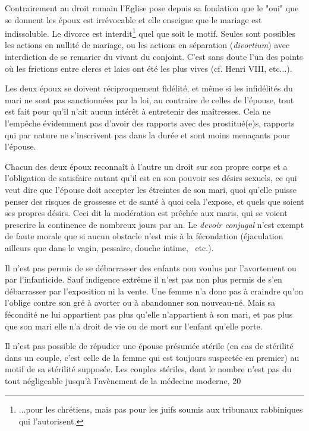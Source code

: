  Contrairement au droit romain l'Eglise pose depuis sa fondation que le "oui" que se donnent les époux est irrévocable et elle enseigne que le mariage est indissoluble. Le divorce est interdit\footnote{...pour les chrétiens, mais pas pour les juifs soumis aux tribunaux rabbiniques qui l'autorisent.} quel que soit le motif. Seules sont possibles les actions en nullité de mariage, ou les actions en séparation (\emph{divortium}) avec interdiction de se remarier du vivant du conjoint. C'est sans doute l'un des points où les frictions entre clercs et laics ont été les plus vives (cf. Henri VIII, etc...).



 Les deux époux se doivent réciproquement fidélité, et même si les infidélités du mari ne sont pas sanctionnées par la loi, au contraire de celles de l'épouse, tout est fait pour qu'il n'ait aucun intérêt à entretenir des maîtresses. Cela ne l'empêche évidemment pas d'avoir des rapports avec des prostitué(e)s, rapports qui par nature ne s'inscrivent pas dans la durée et sont moins menaçants pour l'épouse. 
  
  Chacun des deux époux reconnaît à l'autre un droit sur son propre corps et a l'obligation de satisfaire autant qu'il est en son pouvoir ses désirs sexuels, ce qui veut dire que l'épouse doit accepter les étreintes de son mari, quoi qu'elle puisse penser des risques de grossesse et de santé à quoi cela l'expose, et quels que soient ses propres désirs. Ceci dit la modération est prêchée aux maris, qui se voient prescrire la continence de nombreux jours par an. Le \emph{devoir conjugal} n'est exempt de faute morale que si aucun obstacle n'est mis à la fécondation (éjaculation ailleurs que dans le vagin, pessaire, douche intime, ~etc.). 

Il n'est pas permis de se débarrasser des enfants non voulus par l'avortement ou par l'infanticide. Sauf indigence extrême il n'est pas non plus permis de s'en débarrasser par l'exposition ni la vente. Une femme n'a donc pas à craindre qu'on l'oblige contre son gré à avorter ou à abandonner son nouveau-né. Mais sa fécondité ne lui appartient pas plus qu'elle n'appartient à son mari, et pas plus que son mari elle n'a droit de vie ou de mort sur l'enfant qu'elle porte.


 Il n'est pas possible de répudier une épouse présumée stérile (en cas de stérilité dans un couple, c'est celle de la femme qui est toujours suspectée en premier) au motif de sa stérilité supposée. 
Les couples stériles, dont le nombre n'est pas du tout négligeable jusqu'à l'avènement de la médecine moderne, 20 %

